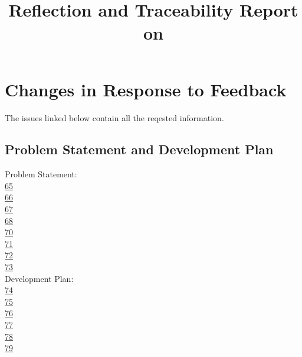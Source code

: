 \documentclass{article}
\title{Reflection and Traceability Report on \progname}
\author{\authname}
\date{}
\begin{document}
\maketitle


\section{Changes in Response to Feedback}

The issues linked below contain all the reqested information.


\subsection{Problem Statement and Development Plan}

Problem Statement:\\

\href{https://github.com/takhtart/PCD/issues/65}{65}\\
\href{https://github.com/takhtart/PCD/issues/66}{66}\\
\href{https://github.com/takhtart/PCD/issues/67}{67}\\
\href{https://github.com/takhtart/PCD/issues/68}{68}\\
\href{https://github.com/takhtart/PCD/issues/70}{70}\\
\href{https://github.com/takhtart/PCD/issues/71}{71}\\
\href{https://github.com/takhtart/PCD/issues/72}{72}\\
\href{https://github.com/takhtart/PCD/issues/73}{73}\\

Development Plan:\\

\href{https://github.com/takhtart/PCD/issues/74}{74}\\
\href{https://github.com/takhtart/PCD/issues/75}{75}\\
\href{https://github.com/takhtart/PCD/issues/76}{76}\\
\href{https://github.com/takhtart/PCD/issues/77}{77}\\
\href{https://github.com/takhtart/PCD/issues/78}{78}\\
\href{https://github.com/takhtart/PCD/issues/79}{79}\\
\end{document}
